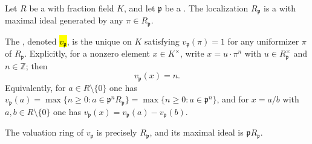 \begin{definition} \label{definition:p_adic_valuation_of_a_prime_of_a_dedekind_domain}
    Let $R$ be a  with fraction field $K$, and let $\mathfrak{p}$ be a . The localization $R_{\mathfrak{p}}$ is a  with maximal ideal generated by any  $\pi \in R_{\mathfrak{p}}$.

    The , denoted \hl{$v_\mathfrak{p}$}, is the unique  on $K$ satisfying $v_\mathfrak{p}(\pi) = 1$ for any uniformizer $\pi$ of $R_{\mathfrak{p}}$. Explicitly, for a nonzero element $x \in K^\times$, write $x = u \cdot \pi^n$ with $u \in R_{\mathfrak{p}}^\times$ and $n \in \mathbb{Z}$; then
    $$v_\mathfrak{p}(x) = n.$$
    Equivalently, for $a \in R \setminus \{0\}$ one has $v_\mathfrak{p}(a) = \max\{n \geq 0 : a \in \mathfrak{p}^n R_{\mathfrak{p}}\} = \max\{n \geq 0 : a \in \mathfrak{p}^n\}$, and for $x = a/b$ with $a,b \in R \setminus \{0\}$ one has $v_\mathfrak{p}(x) = v_\mathfrak{p}(a) - v_\mathfrak{p}(b)$.

    The valuation ring of $v_\mathfrak{p}$ is precisely $R_{\mathfrak{p}}$, and its maximal ideal is $\mathfrak{p} R_{\mathfrak{p}}$.

\end{definition}
